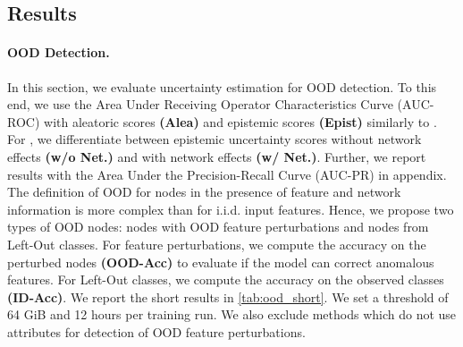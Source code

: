 \subsection{Results}
 
\paragraph{OOD Detection.} In this section, we evaluate uncertainty estimation for OOD detection. To this end, we use the Area Under Receiving Operator Characteristics Curve (AUC-ROC) with aleatoric scores  \textbf{(Alea)} and epistemic scores  \textbf{(Epist)} similarly to \citep{charpentier2020, Zhao2020, PriorNetworks, reverse-kl, distribution-distillation, Liu2020a}. For \GPNacro{}, we differentiate between epistemic uncertainty scores without network effects \textbf{(w/o Net.)} and with network effects \textbf{(w/ Net.)}. Further, we report results with the Area Under the Precision-Recall Curve (AUC-PR) in appendix. The definition of OOD for nodes in the presence of feature and network information is more complex than for i.i.d. input features. Hence, we propose two types of OOD nodes: nodes with OOD feature perturbations and nodes from Left-Out classes. For feature perturbations, we compute the accuracy on the perturbed nodes \textbf{(OOD-Acc)} to evaluate if the model can correct anomalous features. For Left-Out classes, we compute the accuracy on the observed classes \textbf{(ID-Acc)}. We report the short results in \cref{tab:ood_short}. We set a threshold of 64 GiB and 12 hours per training run. We also exclude methods which do not use attributes for detection of OOD feature perturbations. 


